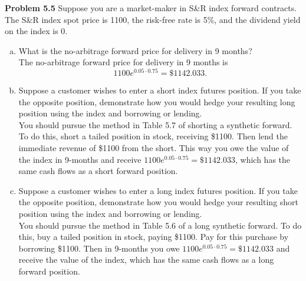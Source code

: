 \documentclass[12pt]{article}
\newcommand{\problem}[1]{\bigskip \noindent \textbf{Problem #1}}
\theoremstyle{plain}
\begin{document}
\problem{5.5} Suppose you are a market-maker in S\&R index forward contracts. The S\&R index spot price is 1100, the risk-free rate is 5\%, and the dividend yield on the index is 0.
\begin{enumerate}[(a)]
\item What is the no-arbitrage forward price for delivery in 9 months?\\

The no-arbitrage forward price for delivery in 9 months is
\[
1100 e^{0.05\cdot 0.75} = \$1142.033.
\]

\item Suppose a customer wishes to enter a short index futures position. If you take the opposite position, demonstrate how you would hedge your resulting long position using the index and borrowing or lending.\\

You should pursue the method in Table 5.7 of shorting a synthetic forward. To do this, short a tailed position in stock, receiving \$1100. Then lend the immediate revenue of \$1100 from the short. This way you owe the value of the index in 9-months and receive $1100e^{0.05\cdot 0.75} = \$1142.033$, which has the same cash flows as a short forward position.

\item Suppose a customer wishes to enter a long index futures position. If you take the opposite position, demonstrate how you would hedge your resulting short position using the index and borrowing or lending.\\

You should pursue the method in Table 5.6 of a long synthetic forward. To do this, buy a tailed position in stock, paying \$1100. Pay for this purchase by borrowing \$1100. Then in 9-months you owe $1100 e^{0.05 \cdot 0.75} = \$1142.033$ and receive the value of the index, which has the same cash flows as a long forward position.
\end{enumerate}
\end{document}
